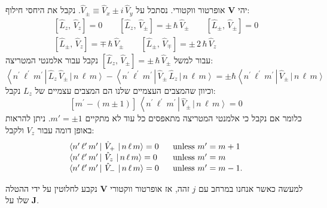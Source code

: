 \documentclass{tstextbook}
\begin{document}
\begin{example}
יהי \(\mathbf{V}\) אופרטור ווקטורי. נסתכל על \(\hat{V}_{\pm}\equiv\hat{V}_{x}\pm i\,\hat{V}_{y}\). נקבל את היחסי חילוף:
$$\begin{gather}{{\left[\hat{L}_{z},\,\hat{V}_{z}\right]=0}}\qquad {{\left[\hat{L}_{z},\,\hat{V}_{\pm}\right]=\pm\,\hbar\,\hat{V}_{\pm}}} \qquad {{\left[\hat{L}_{\pm},\,\hat{V}_{\pm}\right]=0}}\\ {{\left[\hat{L}_{\pm},\,\hat{V}_{z}\right]=\mp\,\hbar\,\hat{V}_{\pm}}}\qquad {{\left[\hat{L}_{\pm},\,\hat{V}_{\mp}\right]=\pm\,2\,\hbar\,\hat{V}_{z}}} 
\end{gather}$$
עבור למשל \(\left[\hat{L}_{z},\,\hat{V}_{\pm}\right]=\pm\,\hbar\,\hat{V}_{\pm}\) נקבל עבור אלמנטי המטריצה:
$$\left\langle n^{\prime}\,\ell^{\prime}\,m^{\prime}\,\right|\,\hat{L}_{z}\,\hat{V}_{\pm}\,\left|\,n\,\ell\,m\right\rangle-\left\langle n^{\prime}\,\ell^{\prime}\,m^{\prime}\,\right|\,\hat{V}_{\pm}\,\hat{L}_{z}\,\left|\,n\,\ell\,m\right\rangle=\pm\hbar\left\langle n^{\prime}\,\ell^{\prime}\,m^{\prime}\,\right|\,\hat{V}_{\pm}\,\left|\,n\,\ell\,m\right\rangle$$
וכיוון שהמצבים העצמיים שלנו הם המצבים עצמיים של \(L_{z}\) נקבל:
$$\left[m^{\prime}-(m\pm1)\right]\,\left\langle n^{\prime}\,\ell^{\prime}\,m^{\prime}\,\right|\,\hat{V}_{\pm}\,\left|\,n\,\ell\,m\right\rangle=0$$
כלומר אם נקבל כי אלמנטי המטריצה מתאפסים כל עוד לא מתקיים \(m'=\pm 1\). ניתן להראות באופן דומה עבור \(V_{z}\) ולקבל:
$$\begin{array}{l l}{{\left<n^{\prime}\,\ell^{\prime}\,m^{\prime}\,\right|\,\hat{V}_{+}\,\left|\,n\,\ell\,m\right>=0}}&{{\ \ \mathrm{unless~}m^{\prime}=m+1}}\\ {{\left<n^{\prime}\,\ell^{\prime}\,m^{\prime}\,\right|\,\hat{V}_{z}\,\left|\,n\,\ell\,m\right>=0}}&{{\ \ \mathrm{unless~}m^{\prime}=m}}\\ {{\left<n^{\prime}\,\ell^{\prime}\,m^{\prime}\,\right|\,\hat{V}_{-}\,\left|\,n\,\ell\,m\right>=0}}&{{\ \ \mathrm{unless~}m^{\prime}=m-1.}}\end{array}$$

\end{example}
\begin{remark}
למעשה כאשר אנחנו במרחב עם \(j\) זהה, אז אופרטור ווקטורי \(\mathbf{V}\) נקבע לחלוטין על ידי ההטלה שלו על \(\mathbf{J}\).

\end{remark}
\end{document}
